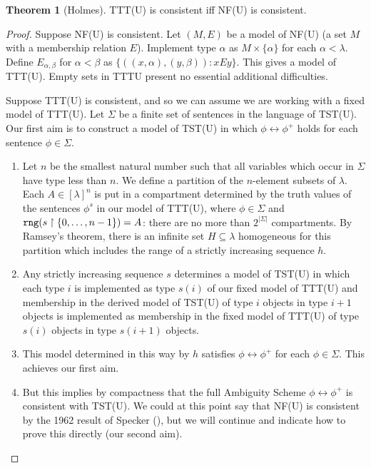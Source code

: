 \documentclass{article}
\theoremstyle{definition}
\newtheorem{theorem}{Theorem}[section]
\theoremstyle{remark}
\begin{document}
\begin{theorem}[Holmes]
  TTT(U) is consistent iff NF(U) is consistent.
\end{theorem}
\begin{proof}\mbox\negthinspace %
 Suppose NF(U) is consistent.  Let $(M,E)$ be a model of NF(U) (a set $M$ with a membership relation $E$).  Implement type $\alpha$ as $M \times \{\alpha\}$ for
each $\alpha<\lambda$.  Define $E_{\alpha,\beta}$ for $\alpha<\beta$ as $\{((x,\alpha),(y,\beta)):xEy\}$.  This gives a model of TTT(U).   Empty sets in TTTU present no essential additional difficulties.



Suppose TTT(U) is consistent, and so we can assume we are working with a fixed model of TTT(U).  Let $\Sigma$ be a finite set of sentences in the language of TST(U).  Our first aim is to construct a model of TST(U) in which $\phi \leftrightarrow \phi^+$ holds for each sentence $\phi \in \Sigma$.
\begin{enumerate}
\item Let $n$ be the smallest natural number such that all variables which occur in $\Sigma$ have type less than $n$. We define a partition of the $n$-element subsets of $\lambda$.  Each $A \in [\lambda]^n$ is put in a compartment
determined by the truth values of the sentences $\phi^s$ in our model of TTT(U), where $\phi \in \Sigma$ and ${\tt rng}(s \restriction \{0,\ldots,n-1\}) = A$:  there are no more than $2^{|\Sigma|}$ compartments.  By Ramsey's theorem, there is an infinite set $H \subseteq \lambda$ homogeneous for this partition  which includes the range of a strictly increasing sequence $h$.

\item Any strictly increasing sequence $s$ determines a model of TST(U) in which each type $i$ is implemented as type $s(i)$ of our fixed model of TTT(U)  and membership in the derived model of TST(U) of type $i$ objects in type $i+1$ objects is implemented as membership in the fixed model of TTT(U) of type $s(i)$ objects in type $s(i+1)$ objects.

\item This model determined in this way by $h$ satisfies  $\phi \leftrightarrow \phi^+$ for each $\phi \in \Sigma$.   This achieves our first aim.

\item But this implies by compactness that the full Ambiguity Scheme $\phi \leftrightarrow \phi^+$ is consistent with TST(U).  We could at this point say that  NF(U) is consistent by the 1962 result of Specker (\cite{ambiguity}), but we will continue and indicate how to prove this directly (our second aim).


\end{enumerate}
\end{proof}
\end{document}
